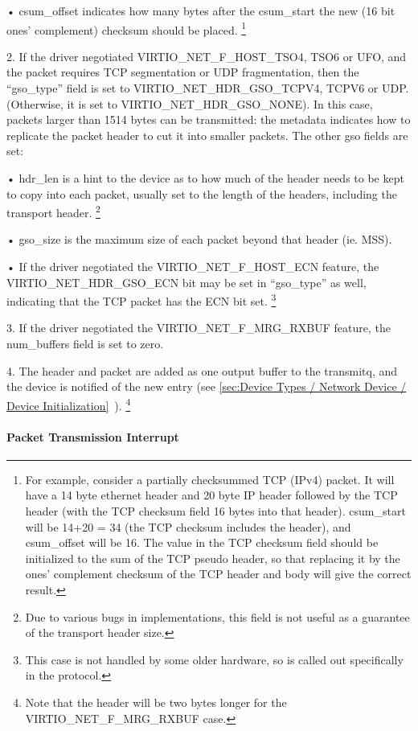   • csum_offset indicates how many bytes after the csum_start the
    new (16 bit ones' complement) checksum should be placed.
\footnote{For example, consider a partially checksummed TCP (IPv4) packet.
It will have a 14 byte ethernet header and 20 byte IP header
followed by the TCP header (with the TCP checksum field 16 bytes
into that header). csum_start will be 14+20 = 34 (the TCP
checksum includes the header), and csum_offset will be 16. The
value in the TCP checksum field should be initialized to the sum
of the TCP pseudo header, so that replacing it by the ones'
complement checksum of the TCP header and body will give the
correct result.
}

2. If the driver negotiated
  VIRTIO_NET_F_HOST_TSO4, TSO6 or UFO, and the packet requires
  TCP segmentation or UDP fragmentation, then the “gso_type”
  field is set to VIRTIO_NET_HDR_GSO_TCPV4, TCPV6 or UDP.
  (Otherwise, it is set to VIRTIO_NET_HDR_GSO_NONE). In this
  case, packets larger than 1514 bytes can be transmitted: the
  metadata indicates how to replicate the packet header to cut it
  into smaller packets. The other gso fields are set:

  • hdr_len is a hint to the device as to how much of the header
    needs to be kept to copy into each packet, usually set to the
    length of the headers, including the transport header.
\footnote{Due to various bugs in implementations, this field is not useful
as a guarantee of the transport header size.
}

  • gso_size is the maximum size of each packet beyond that
    header (ie. MSS).

  • If the driver negotiated the VIRTIO_NET_F_HOST_ECN feature,
    the VIRTIO_NET_HDR_GSO_ECN bit may be set in “gso_type” as
    well, indicating that the TCP packet has the ECN bit set.
\footnote{This case is not handled by some older hardware, so is called out
specifically in the protocol.
}

3. If the driver negotiated the VIRTIO_NET_F_MRG_RXBUF feature,
  the num_buffers field is set to zero.

4. The header and packet are added as one output buffer to the
  transmitq, and the device is notified of the new entry
  (see \ref{sec:Device Types / Network Device / Device Initialization}~).
\footnote{Note that the header will be two bytes longer for the
VIRTIO_NET_F_MRG_RXBUF case.
}

\paragraph{Packet Transmission Interrupt}\label{sec:Device Types / Network Device / Device Operation / Packet Transmission / Packet Transmission Interrupt}

